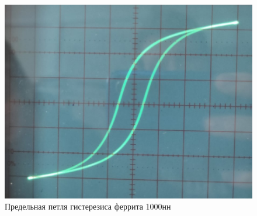 \documentclass[a4paper,12pt]{article}
\begin{document}
\newpage
\begin{figure}[H]\label{fig: Ferrit  pred petlya}
    \centering
    \includegraphics[width = \textwidth]{гистерезис Феррит.png}
    \caption{Предельная петля гистерезиса феррита 1000нн}
\end{figure}

\end{document}
